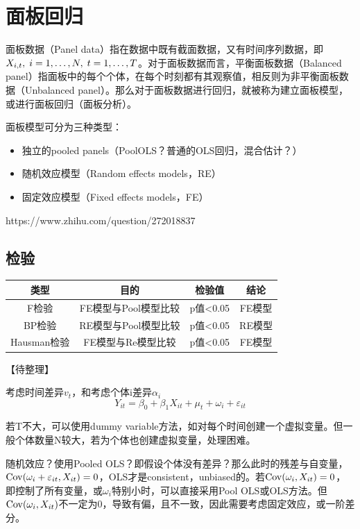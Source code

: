 \documentclass[11pt]{article}
\begin{document}
\section{面板回归}

面板数据（Panel data）指在数据中既有截面数据，又有时间序列数据，即$X_{i,t} ,\; i=1,\dots,N ,\; t=1,\dots,T$。对于面板数据而言，平衡面板数据（Balanced panel）指面板中的每个个体，在每个时刻都有其观察值，相反则为非平衡面板数据（Unbalanced panel）。那么对于面板数据进行回归，就被称为建立面板模型，或进行面板回归（面板分析）。

面板模型可分为三种类型：
\begin{itemize}
    \item 独立的pooled panels（PoolOLS？普通的OLS回归，混合估计？）
    \item 随机效应模型（Random effects models，RE）
    \item 固定效应模型（Fixed effects models，FE）
\end{itemize}

https://www.zhihu.com/question/272018837

\subsection{检验}

\begin{table}[H]
\centering
\begin{tabular}{@{}cccc@{}}
\toprule
\textbf{类型} & \textbf{目的}   & \textbf{检验值}      & \textbf{结论} \\ \midrule
F检验         & FE模型与Pool模型比较 & p值<0.05 & FE模型        \\
BP检验        & RE模型与Pool模型比较 & p值<0.05 & RE模型        \\
Hausman检验   & FE模型与Re模型比较   & p值<0.05 & FE模型        \\ \bottomrule
\end{tabular}
\end{table}

【待整理】

考虑时间差异$v_t$，和考虑个体i差异$\alpha_i$
\begin{equation*}
    Y_{it} = \beta_0 + \beta_1 X_{it} + \mu_t + \omega_i + \varepsilon_{it}
\end{equation*}

若T不大，可以使用dummy variable方法，如对每个时间创建一个虚拟变量。但一般个体数量N较大，若为个体也创建虚拟变量，处理困难。

随机效应？使用Pooled OLS？即假设个体没有差异？那么此时的残差与自变量，$\operatorname{Cov}(\omega_i + \varepsilon_{it},X_{it}) = 0$，OLS才是consistent，unbiased的。若$\operatorname{Cov}(\omega_i,X_{it})=0$，即控制了所有变量，或$\omega_i$特别小时，可以直接采用Pool OLS或OLS方法。但$\operatorname{Cov}(\omega_i,X_{it})$不一定为0，导致有偏，且不一致，因此需要考虑固定效应，或一阶差分。
\end{document}
